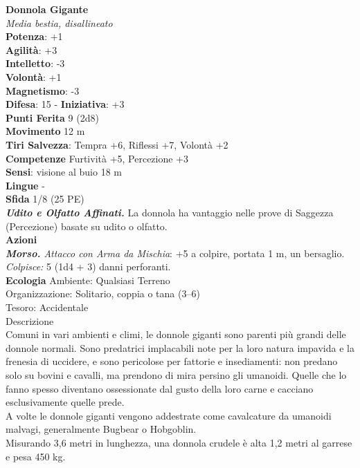 \begin{multicols}{2}
\medskip\textbf{Donnola Gigante}\\
\emph{Media bestia, disallineato}\\
\textbf{Potenza}: +1\\
\textbf{Agilità}: +3\\
\textbf{Intelletto}: -3\\
\textbf{Volontà}: +1\\
\textbf{Magnetismo}: -3\\
\textbf{Difesa}: 15 - \textbf{Iniziativa}: +3\\
\textbf{Punti Ferita} 9 (2d8)\\
\textbf{Movimento} 12 m\\
\textbf{Tiri Salvezza}:  Tempra +6, Riflessi +7, Volontà +2 \\
\textbf{Competenze} Furtività +5, Percezione +3\\
\textbf{Sensi}: visione al buio 18 m\\
\textbf{Lingue} -\\
\textbf{Sfida} 1/8 (25 PE)\smallskip\\
\emph{\textbf{Udito e Olfatto Affinati.}} La donnola ha vantaggio nelle prove di Saggezza (Percezione) basate su udito o olfatto.\\
\smallskip\textbf{Azioni}\\
\emph{\textbf{Morso.} Attacco con Arma da Mischia}: +5 a colpire, portata 1 m, un bersaglio.\\
\emph{Colpisce:} 5 (1d4 + 3) danni perforanti.\\
\textbf{Ecologia}
Ambiente: Qualsiasi Terreno\\
Organizzazione: Solitario, coppia o tana (3–6)\\
Tesoro: Accidentale\\
Descrizione\\

Comuni in vari ambienti e climi, le donnole giganti sono parenti più grandi delle donnole normali. Sono predatrici implacabili note per la loro natura impavida e la frenesia di uccidere, e sono pericolose per fattorie e insediamenti: non predano solo su bovini e cavalli, ma prendono di mira persino gli umanoidi. Quelle che lo fanno spesso diventano ossessionate dal gusto della loro carne e cacciano esclusivamente quelle prede.\\
A volte le donnole giganti vengono addestrate come cavalcature da umanoidi malvagi, generalmente Bugbear o Hobgoblin.\\
Misurando 3,6 metri in lunghezza, una donnola crudele è alta 1,2 metri al garrese e pesa 450 kg. \\


\end{multicols}
